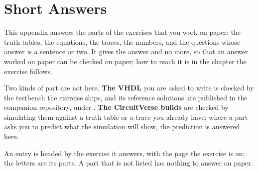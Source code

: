 
\chapter{Short Answers}
\label{app:answers}

This appendix answers the parts of the exercises that you work on paper: the truth tables, the
equations, the traces, the numbers, and the questions whose answer is a sentence or two. It gives
the answer and no more, so that an answer worked on paper can be checked on paper; how to reach it
is in the chapter the exercise follows.

Two kinds of part are not here. \textbf{The VHDL} you are asked to write is checked by the
testbench the exercise ships, and its reference solutions are published in the companion
repository, under . \textbf{The CircuitVerse builds} are checked by
simulating them against a truth table or a trace you already have; where a part asks you to
predict what the simulation will show, the prediction is answered here.

An entry is headed by the exercise it answers, with the page the exercise is on; the letters are
its parts. A part that is not listed has nothing to answer on paper.









